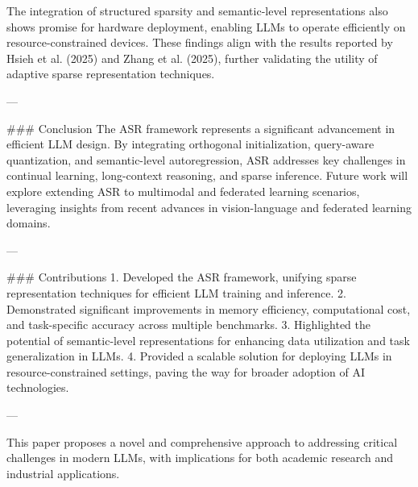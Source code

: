 The integration of structured sparsity and semantic-level representations also shows promise for hardware deployment, enabling LLMs to operate efficiently on resource-constrained devices. These findings align with the results reported by Hsieh et al. (2025) and Zhang et al. (2025), further validating the utility of adaptive sparse representation techniques.

---

### Conclusion  
The ASR framework represents a significant advancement in efficient LLM design. By integrating orthogonal initialization, query-aware quantization, and semantic-level autoregression, ASR addresses key challenges in continual learning, long-context reasoning, and sparse inference. Future work will explore extending ASR to multimodal and federated learning scenarios, leveraging insights from recent advances in vision-language and federated learning domains.

---

### Contributions  
1. Developed the ASR framework, unifying sparse representation techniques for efficient LLM training and inference.  
2. Demonstrated significant improvements in memory efficiency, computational cost, and task-specific accuracy across multiple benchmarks.  
3. Highlighted the potential of semantic-level representations for enhancing data utilization and task generalization in LLMs.  
4. Provided a scalable solution for deploying LLMs in resource-constrained settings, paving the way for broader adoption of AI technologies.

--- 

This paper proposes a novel and comprehensive approach to addressing critical challenges in modern LLMs, with implications for both academic research and industrial applications.
